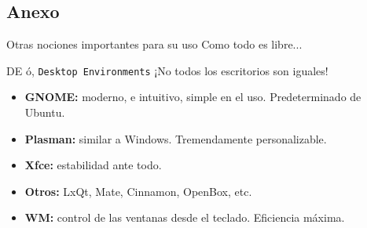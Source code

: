 \documentclass[12pt]{beamer}
\begin{document}
\subsection{Anexo}
\begin{frame}{Otras nociones importantes para su uso}
	Como todo es libre...
	\begin{block}{DE ó, \texttt{Desktop Environments}}
		¡No todos los escritorios son iguales!
		\begin{itemize}
			\item \textbf{GNOME:}  moderno, e intuitivo, simple en el uso. Predeterminado de Ubuntu.
			\item \textbf{Plasman:} similar a Windows. Tremendamente personalizable.
			\item \textbf{Xfce:} estabilidad ante todo.
			\item \textbf{Otros:} LxQt, Mate, Cinnamon, OpenBox, etc.
			\item \textbf{WM:} control de las ventanas desde el teclado. Eficiencia máxima.
		\end{itemize}
	\end{block}
\end{frame}
\end{document}
